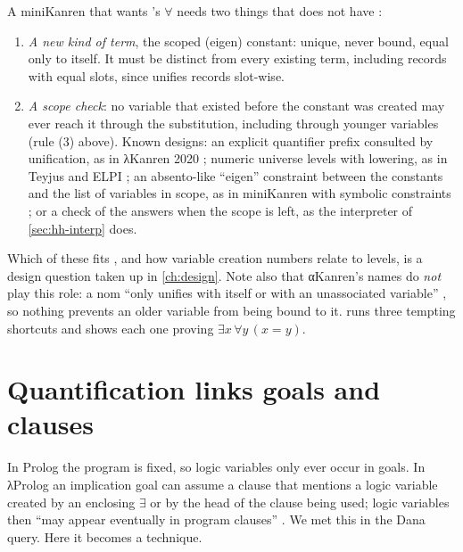 {\begin{kanren}
A miniKanren that wants \fohh's $\forall$ needs two things that \micro{} does not have
\cite{MaLuFriedman2020,HemannByrdFriedman2013,NadathurJayaramanKwon1995}:
\begin{enumerate}
  \item \emph{A new kind of term}, the scoped (eigen) constant: unique, never bound, equal only to
        itself. It must be distinct from every existing term, including records with equal slots,
        since \micro{} unifies records slot-wise.
  \item \emph{A scope check}: no variable that existed before the constant was created may ever reach it
        through the substitution, including through younger variables (rule (3) above). Known designs:
        an explicit quantifier prefix consulted by unification, as in λKanren 2020
        \cite{MaLuFriedman2020}; numeric universe levels with lowering, as in Teyjus and ELPI
        \cite{NadathurJayaramanKwon1995,DunchevEtAl2015}; an absento-like ``eigen'' constraint between the
        constants and the list of variables in scope, as in miniKanren with symbolic constraints
        \cite{HemannByrdFriedman2013}; or a check of the answers when the scope is left, as the
        interpreter of \cref{sec:hh-interp} does.
\end{enumerate}
Which of these fits \micro, and how variable creation numbers relate to levels, is a design question
taken up in \cref{ch:design}. Note also that αKanren's names do \emph{not} play this role: a nom ``only
unifies with itself or with an unassociated variable'' \cite{Byrd2009}, so nothing prevents an older
variable from being bound to it.  runs three tempting shortcuts and shows each
one proving $\exists x\,\forall y\,(x=y)$.
\end{kanren}

\section{Quantification links goals and clauses}\label{sec:hh-link}

In Prolog the program is fixed, so logic variables only ever occur in goals. In λProlog an
implication goal can assume a clause that mentions a logic variable created by an enclosing $\exists$ or by
the head of the clause being used; logic variables then ``may appear eventually in program clauses''
. We met this in the Dana query. Here it becomes a technique.

}
